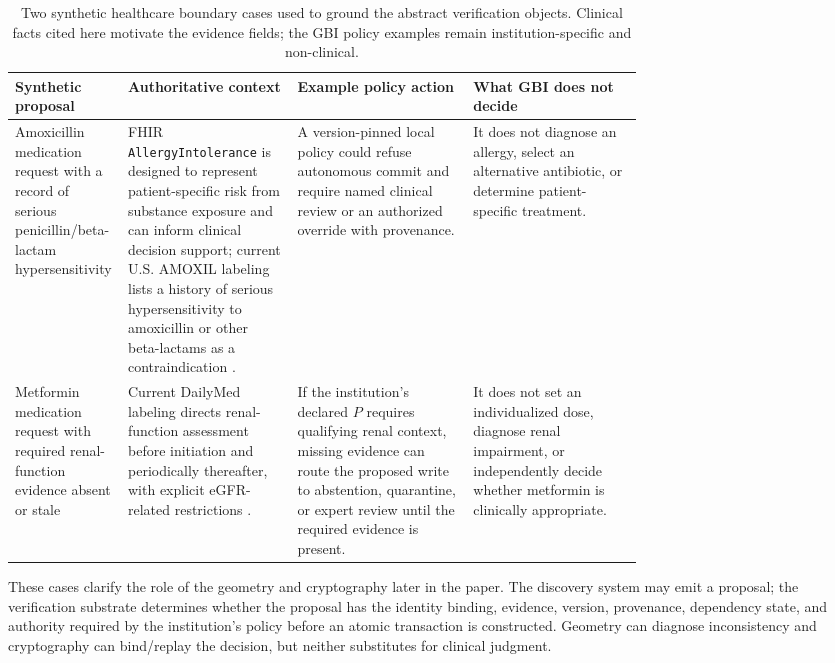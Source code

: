 \documentclass[11pt]{article}
\newcommand{\code}[1]{\texttt{#1}}
\begin{document}
\begin{table}[H]
\centering
\small
\caption{Two synthetic healthcare boundary cases used to ground the abstract verification objects. Clinical facts cited here motivate the evidence fields; the GBI policy examples remain institution-specific and non-clinical.}
\label{tab:clinical-cases}
\begin{tabularx}{\linewidth}{>{\RaggedRight\arraybackslash}p{0.18\linewidth} >{\RaggedRight\arraybackslash}p{0.27\linewidth} >{\RaggedRight\arraybackslash}p{0.28\linewidth} >{\RaggedRight\arraybackslash}X}
\toprule
Synthetic proposal & Authoritative context & Example policy action & What GBI does not decide\\
\midrule
Amoxicillin medication request with a record of serious penicillin/beta-lactam hypersensitivity & FHIR \code{AllergyIntolerance} is designed to represent patient-specific risk from substance exposure and can inform clinical decision support; current U.S. AMOXIL labeling lists a history of serious hypersensitivity to amoxicillin or other beta-lactams as a contraindication \cite{fhirAllergy,fdaAmoxil}. & A version-pinned local policy could refuse autonomous commit and require named clinical review or an authorized override with provenance. & It does not diagnose an allergy, select an alternative antibiotic, or determine patient-specific treatment.\\
\addlinespace
Metformin medication request with required renal-function evidence absent or stale & Current DailyMed labeling directs renal-function assessment before initiation and periodically thereafter, with explicit eGFR-related restrictions \cite{dailymedMetformin}. & If the institution's declared \(P\) requires qualifying renal context, missing evidence can route the proposed write to abstention, quarantine, or expert review until the required evidence is present. & It does not set an individualized dose, diagnose renal impairment, or independently decide whether metformin is clinically appropriate.\\
\bottomrule
\end{tabularx}
\end{table}

These cases clarify the role of the geometry and cryptography later in the paper. The discovery system may emit a proposal; the verification substrate determines whether the proposal has the identity binding, evidence, version, provenance, dependency state, and authority required by the institution's policy before an atomic transaction is constructed. Geometry can diagnose inconsistency and cryptography can bind/replay the decision, but neither substitutes for clinical judgment.
\end{document}
